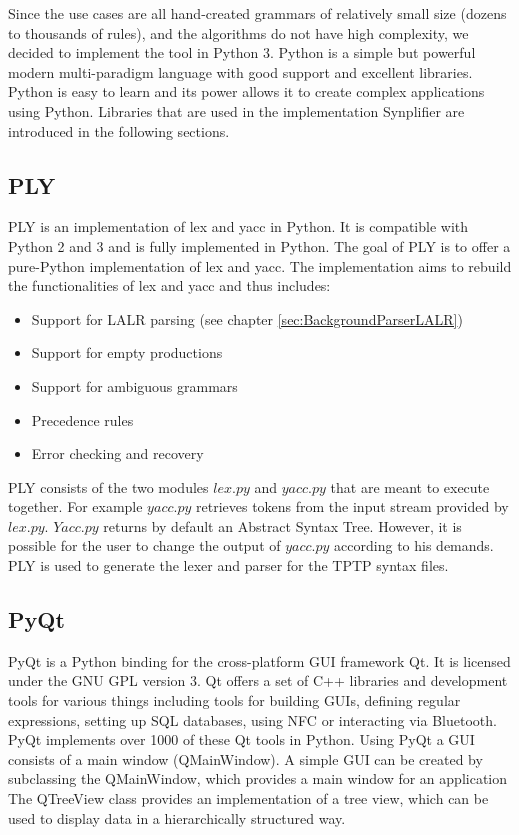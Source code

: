 Since the use cases are all hand-created grammars of relatively small size (dozens to thousands of rules), and the algorithms do not have high complexity, we decided to implement the tool in Python 3. 
Python is a simple but powerful modern multi-paradigm language with good support and excellent libraries.
Python is easy to learn and its power allows it to create complex applications using Python.
Libraries that are used in the implementation \ac{Synplifier} are introduced in the following sections.

\subsection{PLY}\label{sec:BackgroundPythonPLY}

\acf{PLY} is an implementation of lex and yacc in Python. It is compatible with Python 2 and 3 and is fully implemented in Python. The goal of \ac{PLY} is to offer a pure-Python implementation of lex and yacc. The implementation aims to rebuild the functionalities of lex and yacc and thus includes:
\begin{itemize}
\item Support for LALR parsing (see chapter \ref{sec:BackgroundParserLALR})
\item Support for empty productions
\item Support for ambiguous grammars 
\item Precedence rules
\item Error checking and recovery
\end{itemize}

\ac{PLY} consists of the two modules $lex.py$ and $yacc.py$ that are meant to execute together. For example $yacc.py$ retrieves tokens from the input stream provided by $lex.py$. $Yacc.py$ returns by default an Abstract Syntax Tree. However, it is possible for the user to change the output of $yacc.py$ according to his demands.
\cite{PLY}
PLY is used to generate the lexer and parser for the \ac{TPTP} syntax files.


\subsection{PyQt}\label{sec:BackgroundPytonPyQt}

PyQt is a Python binding for the cross-platform GUI framework Qt.
It is licensed under the GNU GPL version 3.
Qt offers a set of C++ libraries and development tools for various things including tools for building GUIs, defining regular expressions, setting up SQL databases, using NFC or interacting via Bluetooth.
PyQt implements over 1000 of these Qt tools in Python.
Using PyQt a GUI consists of a main window (QMainWindow).
A simple GUI can be created by subclassing the QMainWindow, which provides a main window for an application
The QTreeView class provides an implementation of a tree view, which can be used to display data in a hierarchically structured way. \cite{PyQt}

